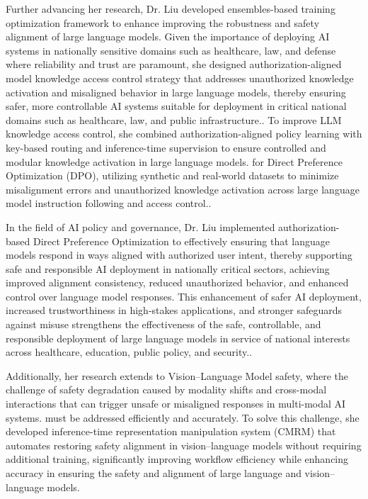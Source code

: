 \documentclass{article}
\begin{document}
Further advancing her research, Dr. Liu developed ensembles-based training optimization framework to enhance improving the robustness and safety alignment of large language models. Given the importance of  deploying AI systems in nationally sensitive domains such as healthcare, law, and defense where reliability and trust are paramount, she designed authorization-aligned model knowledge access control strategy that addresses unauthorized knowledge activation and misaligned behavior in large language models, thereby ensuring safer, more controllable AI systems suitable for deployment in critical national domains such as healthcare, law, and public infrastructure.. To improve LLM knowledge access control, she combined authorization-aligned policy learning with key-based routing and inference-time supervision to ensure controlled and modular knowledge activation in large language models. for Direct Preference Optimization (DPO), utilizing synthetic and real-world datasets to minimize misalignment errors and unauthorized knowledge activation across large language model instruction following and access control..

In the field of AI policy and governance, Dr. Liu implemented authorization-based Direct Preference Optimization to effectively ensuring that language models respond in ways aligned with authorized user intent, thereby supporting safe and responsible AI deployment in nationally critical sectors, achieving improved alignment consistency, reduced unauthorized behavior, and enhanced control over language model responses. This enhancement of safer AI deployment, increased trustworthiness in high-stakes applications, and stronger safeguards against misuse strengthens the effectiveness of the safe, controllable, and responsible deployment of large language models in service of national interests across healthcare, education, public policy, and security..

Additionally, her research extends to Vision–Language Model safety, where the challenge of safety degradation caused by modality shifts and cross-modal interactions that can trigger unsafe or misaligned responses in multi-modal AI systems. must be addressed efficiently and accurately. To solve this challenge, she developed inference-time representation manipulation system (CMRM) that automates restoring safety alignment in vision–language models without requiring additional training, significantly improving workflow efficiency while enhancing accuracy in ensuring the safety and alignment of large language and vision–language models.
\end{document}
